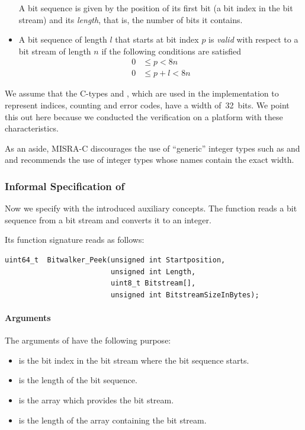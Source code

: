 \begin{itemize}
A bit sequence is given by the position of its first bit (a bit index in the bit stream)
and its \emph{length}, that is, the number of bits it contains.

\item A bit sequence of length $l$ that starts at bit index $p$ is \emph{valid}
     with respect to a bit stream of length $n$ if the following conditions are
     satisfied
     \begin{align*}
         0 &\leq p < 8n \\
         0 &\leq p + l < 8n
     \end{align*}

\end{itemize}

We assume that the C-types  and , which
are used in the implementation to represent indices, counting and error codes,
have a width of~32~bits.
We point this out here because we conducted the verification on a platform with
these characteristics.

As an aside, MISRA-C discourages the use of ``generic'' integer types
such as  and  and recommends the use of integer types whose names
contain the exact width.

\subsubsection{Informal Specification of \peek}
\label{informal-peek}

Now we specify \peek with the introduced auxiliary concepts.
The function \peek reads a bit sequence from a bit stream
and converts it to an integer.

Its function signature reads as follows:

\begin{lstlisting}[style=acsl-block]
uint64_t  Bitwalker_Peek(unsigned int Startposition, 
                         unsigned int Length,
                         uint8_t Bitstream[],
                         unsigned int BitstreamSizeInBytes);
\end{lstlisting}

\paragraph{Arguments}
The arguments of \peek have the following purpose:
\begin{itemize}
    \item {} is the bit index in the bit stream 
    where the bit sequence starts.
    \item {} is the length of the bit sequence.
    \item {} is the array which provides the bit stream.
    \item {} is the length of the array 
    containing the bit stream. 
\end{itemize}

